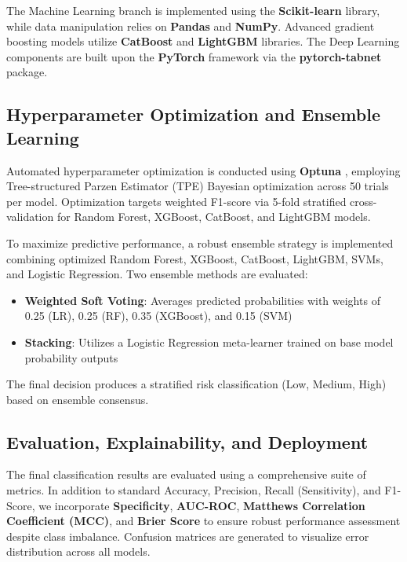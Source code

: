 The Machine Learning branch is implemented using the \textbf{Scikit-learn} library, while data manipulation relies on \textbf{Pandas} and \textbf{NumPy}. Advanced gradient boosting models utilize \textbf{CatBoost} and \textbf{LightGBM} libraries. The Deep Learning components are built upon the \textbf{PyTorch} framework via the \textbf{pytorch-tabnet} package.

\subsection{Hyperparameter Optimization and Ensemble Learning}
Automated hyperparameter optimization is conducted using \textbf{Optuna} \cite{Akiba2019}, employing Tree-structured Parzen Estimator (TPE) Bayesian optimization across 50 trials per model. Optimization targets weighted F1-score via 5-fold stratified cross-validation for Random Forest, XGBoost, CatBoost, and LightGBM models.

To maximize predictive performance, a robust ensemble strategy is implemented combining optimized Random Forest, XGBoost, CatBoost, LightGBM, SVMs, and Logistic Regression. Two ensemble methods are evaluated:
\begin{itemize}
    \item \textbf{Weighted Soft Voting}: Averages predicted probabilities with weights of 0.25 (LR), 0.25 (RF), 0.35 (XGBoost), and 0.15 (SVM)
    \item \textbf{Stacking}: Utilizes a Logistic Regression meta-learner trained on base model probability outputs
\end{itemize}

The final decision produces a stratified risk classification (Low, Medium, High) based on ensemble consensus.

\subsection{Evaluation, Explainability, and Deployment}
The final classification results are evaluated using a comprehensive suite of metrics. In addition to standard Accuracy, Precision, Recall (Sensitivity), and F1-Score, we incorporate \textbf{Specificity}, \textbf{AUC-ROC}, \textbf{Matthews Correlation Coefficient (MCC)}, and \textbf{Brier Score} to ensure robust performance assessment despite class imbalance. Confusion matrices are generated to visualize error distribution across all models.

